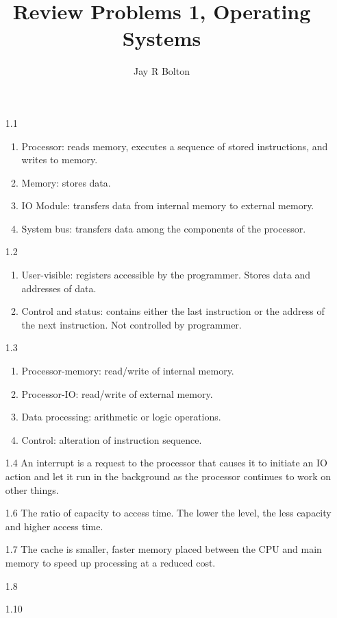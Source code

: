\documentclass{article}
\title{Review Problems 1, Operating Systems}
\author{Jay R Bolton}
\begin{document}
\maketitle

\begin{enumerate}
\item[1.1]  
  \begin{enumerate}
    \item
     Processor: reads memory, executes a sequence of stored
     instructions, and writes to memory.
    \item
     Memory: stores data.
    \item
     IO Module: transfers data from internal memory to external
     memory.
    \item
     System bus: transfers data among the components of the
     processor.
  \end{enumerate}

\item[1.2]
  \begin{enumerate}
    \item
     User-visible: registers accessible by the programmer. Stores
     data and addresses of data.
    \item
     Control and status: contains either the last instruction or the
     address of the next instruction. Not controlled by programmer.
  \end{enumerate}

\item[1.3]
 \begin{enumerate}
  \item
   Processor-memory: read/write of internal memory.
  \item
   Processor-IO: read/write of external memory.
  \item
   Data processing: arithmetic or logic operations.
  \item
   Control: alteration of instruction sequence.
 \end{enumerate}

\item[1.4]
 An interrupt is a request to the processor that causes it to
 initiate an IO action and let it run in the background as the
 processor continues to work on other things. 
 
\item[1.6]
 The ratio of capacity to access time. The lower the level, the
 less capacity and higher access time. 

\item[1.7]
 The cache is smaller, faster memory placed between the CPU and main
 memory to speed up processing at a reduced cost.

 \item[1.8]
  

\item[1.10]




\end{enumerate}
\end{document}
